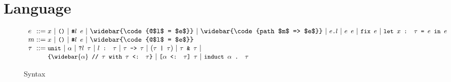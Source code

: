 \documentclass[acmsmall]{acmart}
\begin{document}

\section{Language}

\begin{figure*}[h]
\[
  \begin{array}{l @{} l}
    e 
    &{} ::=
    \begin{array}[t]{@{} l}
      \code{$x$}
      \ |\ 
      \code{()}
      \ |\ 
      \code{\#$l$ $e$} 
      \ |\ 
      \widebar{\code{@$l$ = $e$}}
      \ |\ 
      \widebar{\code{path $m$ => $e$}} 
      \ |\ 
      \code{$e$.$l$}
      \ |\ 
      \code{$e$ $e$} 
      \ |\ 
      \code{fix $e$}
      \ |\ 
      \code{let $x$ : $\tau$ = $e$ in $e$}
    \end{array}
    \\
    m 
    &{} ::=
    \begin{array}[t]{@{} l}
      \code{$x$}
      \ |\ 
      \code{()}
      \ |\ 
      \code{\#$l$ $e$} 
      \ |\ 
      \widebar{\code{@$l$ = $e$}}
    \end{array}
    \\
    \tau
    &{} ::=
    \begin{array}[t]{@{} l}
      \code{unit} 
      \ |\ 
      \code{$\alpha$} 
      \ |\ 
      \code{?$l$ $\tau$} 
      \ |\ 
      \code{$l$ : $\tau$} 
      \ |\ 
      \code{$\tau$ -> $\tau$} 
      \ |\ 
      (\code{$\tau$ | $\tau$})
      \ |\ 
      \code{$\tau$ \& $\tau$}
      \ |\ 
      \\
      \code{\{$\widebar{\alpha}$ // $\tau$ with $\tau$ <: $\tau$\}}
      \ |\ 
      \code{[$\alpha$ <: $\tau$] $\tau$}
      \ |\ 
      \code{induct $\alpha$ . $\tau$}
    \end{array}
  \end{array}
\]

\caption{Syntax}
\end{figure*}
\end{document}
